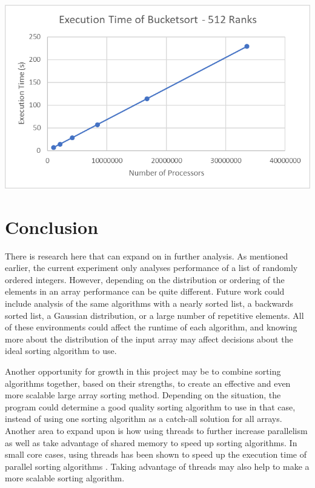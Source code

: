 \documentclass[10pt,letterpaper]{article}
\begin{document}
\begin{multicols}{2}
\begin{center}
\includegraphics[scale=1]{bucketsort_512}
\end{center}

\section{Conclusion}
There is research here that can expand on in further analysis. As mentioned earlier, the current experiment only analyses performance of a list of randomly ordered integers. However, depending on the distribution or ordering of the elements in an array performance can be quite different. Future work could include analysis of the same algorithms with a nearly sorted list, a backwards sorted list, a Gaussian distribution, or a large number of repetitive elements. All of these environments could affect the runtime of each algorithm, and knowing more about the distribution of the input array may affect decisions about the ideal sorting algorithm to use.

Another opportunity for growth in this project may be to combine sorting algorithms together, based on their strengths, to create an effective and even more scalable large array sorting method. Depending on the situation, the program could determine a good quality sorting algorithm to use in that case, instead of using one sorting algorithm as a catch-all solution for all arrays. Another area to expand upon is how using threads to further increase parallelism as well as take advantage of shared memory to speed up sorting algorithms. In small core cases, using threads has been shown to speed up the execution time of parallel sorting algorithms \cite{DBLP:journals/corr/abs-1808-10292}. Taking advantage of threads may also help to make a more scalable sorting algorithm.


\end{multicols}
\end{document}
